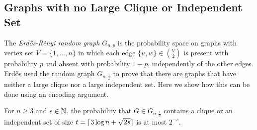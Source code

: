 \documentclass[prodmode,acmcsur]{acmsmall}
\begin{document}
\subsection{Graphs with no Large Clique or Independent Set}

The \emph{Erd\H{o}s-R\'enyi random graph} $G_{n,p}$ is the
probability space on
graphs with vertex set $V=\{1,\ldots,n\}$ in which each edge $\{u,
w\} \in \binom{V}{2}$ is present with probability $p$ and absent with
probability $1-p$, independently of the other edges.  Erd\H{o}s
\cite{erdos:some} used the random graph $G_{n,\frac{1}{2}}$ to prove
that there are graphs that have neither a large clique nor a large 
independent set. Here we show how this can be done using an encoding
argument.

\begin{thm}
  For $n \ge 3$ and $s \in \mathbb{N}$, the probability that $G \in G_{n,\frac{1}{2}}$
  contains a clique or an independent set of size $t = {\lceil 3\log n +
    \sqrt{2s} \rceil}$ is at most $2^{-s}$.
\end{thm}
\end{document}
